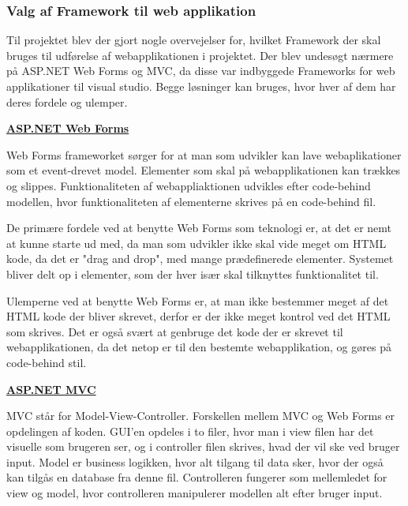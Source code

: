 \subsubsection{Valg af Framework til web applikation} 

\noindent Til projektet blev der gjort nogle overvejelser for, hvilket Framework der skal bruges til udførelse af webapplikationen i projektet. Der blev undesøgt nærmere på ASP.NET Web Forms og MVC, da disse var indbyggede Frameworks for web applikationer til visual studio. Begge løsninger kan bruges, hvor hver af dem har deres fordele og ulemper. \newline

\noindent \textbf{\underline{ASP.NET Web Forms}}

\noindent Web Forms frameworket sørger for at man som udvikler kan lave webaplikationer som et event-drevet model. Elementer som skal på webapplikationen kan trækkes og slippes. Funktionaliteten af webappliaktionen udvikles efter code-behind modellen, hvor funktionaliteten af elementerne skrives på en code-behind fil. \newline 

\noindent De primære fordele ved at benytte Web Forms som teknologi er, at det er nemt at kunne starte ud med, da man som udvikler ikke skal vide meget om HTML kode, da det er "drag and drop", med mange prædefinerede elementer.
Systemet bliver delt op i elementer, som der hver især skal tilknyttes funktionalitet til. \newline 

\noindent Ulemperne ved at benytte Web Forms er, at man ikke bestemmer meget af det HTML kode der bliver skrevet, derfor er der ikke meget kontrol ved det HTML som skrives. \newline
\noindent Det er også svært at genbruge det kode der er skrevet til webapplikationen, da det netop er til den bestemte webapplikation, og gøres på code-behind stil. \newline

\noindent \textbf{\underline{ASP.NET MVC}}

\noindent MVC står for Model-View-Controller. Forskellen mellem MVC og Web Forms er opdelingen af koden. GUI'en opdeles i to filer, hvor man i view filen har det visuelle som brugeren ser, og i controller filen skrives, hvad der vil ske ved bruger input. Model er business logikken, hvor alt tilgang til data sker, hvor der også kan tilgås en database fra denne fil. Controlleren fungerer som mellemledet for view og model, hvor controlleren manipulerer modellen alt efter bruger input. \newline

